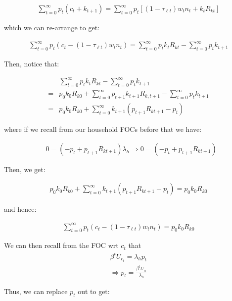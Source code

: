 \documentclass[10pt]{article}
\begin{document}
\begin{align}
    \sum_{t=0}^{\infty} p_t\left(c_t+k_{t+1}\right)=\sum_{t=0}^{\infty} p_t\left[\left(1-\tau_{\ell t}\right) w_t n_t+k_t R_{k t}\right]
\end{align}

which we can re-arrange to get:

\begin{align}
    \sum_{t=0}^{\infty} p_t\left(c_t-\left(1-\tau_{\ell t}\right) w_t n_t\right)=\sum_{t=0}^{\infty} p_t k_t R_{k t}-\sum_{t=0}^{\infty} p_t k_{t+1}
\end{align}

Then, notice that:

\begin{align}
        &\sum_{t=0}^{\infty} p_t k_t R_{k t}-\sum_{t=0}^{\infty} p_t k_{t+1} \\
        =&p_0 k_0 R_{k 0} + \sum_{t=0}^{\infty} p_{t+1} k_{t+1} R_{k, t+1} -\sum_{t=0}^{\infty} p_t k_{t+1} \\
        =&p_0 k_0 R_{k 0}+\sum_{t=0}^{\infty} k_{t+1}\left(p_{t+1} R_{k t+1}-p_t\right)
\end{align}

where if we recall from our household FOCs before that we have:

\begin{align}
    &0=\left(-p_t+p_{t+1} R_{k t+1}\right) \lambda_h 
    \Rightarrow0 =\left(-p_t+p_{t+1} R_{k t+1}\right)
\end{align}

Then, we get:

\begin{align}
    p_0 k_0 R_{k 0}+\sum_{t=0}^{\infty} k_{t+1}\left(p_{t+1} R_{k t+1}-p_t\right) =p_0 k_0 R_{k 0}
\end{align}

and hence:

\begin{align}
    \sum_{t=0}^{\infty} p_t\left(c_t-\left(1-\tau_{\ell t}\right) w_t n_t\right)=p_0 k_0 R_{k 0}
\end{align}

We can then recall from the FOC wrt $c_t$ that 
\begin{align}
    \beta^t U_{c_t}=\lambda_h p_t \\
    \Rightarrow p_t = \frac{\beta^t U_{c_t}}{\lambda_h}
\end{align}

Thus, we can replace $p_t$ out to get:
\end{document}
